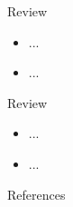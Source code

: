 \documentclass{beamer}
\begin{document}
\begin{frame}{Review}

\begin{itemize}
  \itemsep12pt
  \item ...
  \item ...
\end{itemize}

\end{frame}


\begin{frame}{Review}

\begin{itemize}
  \itemsep12pt
  \item ...
  \item ...
\end{itemize}

\end{frame}


\setbeamercovered{}
\beamerdefaultoverlayspecification{}

\begin{frame}[c,allowframebreaks]{References}

\small

\nocite{*}

\itemize

\end{frame}

\end{document}

